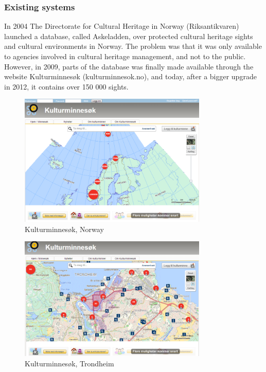 \documentclass[11pt]{book}
\begin{document}
\subsubsection{Existing systems}
In 2004 The Directorate for Cultural Heritage in Norway (Riksantikvaren) launched a database, called Askeladden, over protected cultural heritage sights and cultural environments in Norway. The problem was that it was only available to agencies involved in cultural heritage management, and not to the public. However,  in 2009, parts of the database was finally made available through the website Kulturminnesøk (kulturminnesok.no), and today, after a bigger upgrade in 2012, it contains over 150 000 sights.

\begin{figure}[H]
      \centering
      \includegraphics[width=0.8\textwidth]{Figures/Prestudy/kulturminnesokOversikt.png}
      \caption{Kulturminnesøk, Norway}
      \label{fig:pre_kulturoversikt}
\end{figure}

\begin{figure}[H]
      \centering
      \includegraphics[width=0.8\textwidth]{Figures/Prestudy/kulturminnesokTrondheim.png}
      \caption{Kulturminnesøk, Trondheim}
      \label{fig:pre_kulturTrondheim}
\end{figure}
\end{document}
